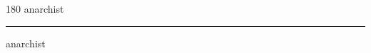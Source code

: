 
\begin{frame}
\begin{center}
\begin{turn}{180}
{\fontsize{2.5cm}{1em}\selectfont anarchist}
\end{turn}
\vspace{1em}\par  
\hrule
\vspace{1em}\par  
{\fontsize{2.5cm}{1em}\selectfont anarchist}
\end{center}
\end{frame}
